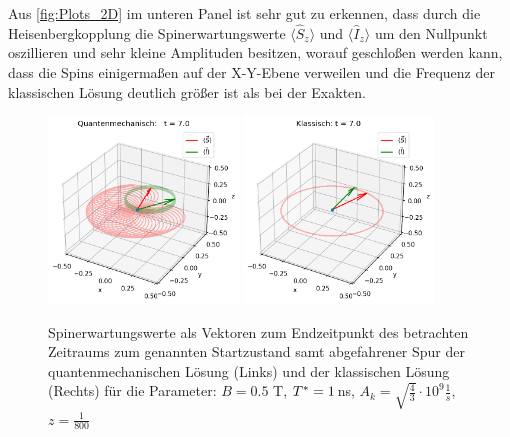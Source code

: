 Aus \autoref{fig:Plots_2D} im unteren Panel ist sehr gut zu erkennen, dass durch die Heisenbergkopplung die Spinerwartungswerte $\langle\hat{S}_z \rangle$ 
und $\langle\hat{I}_z \rangle$ um den Nullpunkt oszillieren und sehr kleine Amplituden besitzen, worauf geschloßen werden kann, dass die 
Spins einigermaßen auf der X-Y-Ebene verweilen und die Frequenz der klassischen Lösung deutlich größer ist als bei der Exakten.
\begin{figure}[h!]
    \centering
    \includegraphics[width = 0.45\textwidth]{Abbildungen/Plot_Vektor_Quant.png}
    \includegraphics[width = 0.45\textwidth]{Abbildungen/Plot_Vektor_Klassisch.png}
    \caption{Spinerwartungswerte als Vektoren zum Endzeitpunkt des betrachten Zeitraums zum genannten Startzustand samt abgefahrener Spur der
    quantenmechanischen Lösung (Links) und der klassischen Lösung (Rechts) für die Parameter: $B = 0.5$ T, $T^*= 1 \thinspace$ns, $A_k = \sqrt{\frac{4}{3}}\cdot 10^9 \frac{1}{s}$,
    $z=\frac{1}{800}$}
    \label{fig:Plots_3D}
\end{figure}

